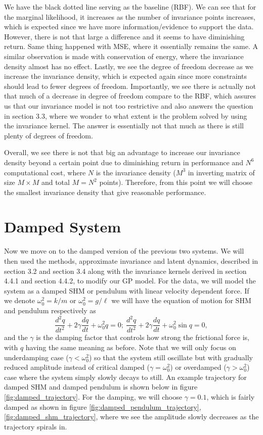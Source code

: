 \documentclass{statsmsc}
\begin{document}
We have the black dotted line serving as the baseline (RBF).
We can see that for the marginal likelihood, it increases as the number of invariance points increases, which is expected since we have more information/evidence to support the data.
However, there is not that large a difference and it seems to have diminishing return.
Same thing happened with MSE, where it essentially remains the same.
A similar observation is made with conservation of energy, where the invariance density almost has no effect. 
Lastly, we see the degree of freedom decrease as we increase the invariance density, which is expected again since more constraints should lead to fewer degrees of freedom.
Importantly, we see there is actually not that much of a decrease in degree of freedom compare to the RBF, which assures us that our invariance model is not too restrictive and also answers the question in section 3.3, where we wonder to what extent is the problem solved by using the invariance kernel.
The answer is essentially not that much as there is still plenty of degrees of freedom.

Overall, we see there is not that big an advantage to increase our invariance density beyond a certain point due to diminishing return in performance and $N^6$ computational cost, where $N$ is the invariance density ($M^3$ in inverting matrix of size $M\times M$ and total $M=N^2$ points).
Therefore, from this point we will choose the smallest invariance density that give reasonable performance.  


\section{Damped System}
Now we move on to the damped version of the previous two systems. 
We will then used the methods, approximate invariance and latent dynamics, described in section 3.2 and section 3.4 along with the invariance kernels derived in section 4.4.1 and section 4.4.2, to modify our GP model. 
For the data, we will model the system as a damped SHM or pendulum with linear velocity dependent force.
If we denote $\omega_0^2=k/m$ or $\omega_0^2=g/\ell$
we will have the equation of motion for SHM and pendulum respectively as
$$
\frac{d^2q}{dt^2}+2\gamma\frac{dq}{dt}+\omega_0^2q=0;\ \frac{d^2q}{dt^2}+2\gamma\frac{dq}{dt}+\omega_0^2\sin q=0 ,
$$
and the $\gamma$ is the damping factor that controls how strong the frictional force is, with $q$ having the same meaning as before. 
Note that we will only focus on underdamping case ($\gamma < \omega_0^2$) so that the system still oscillate but with gradually reduced amplitude instead of critical damped ($\gamma=\omega_0^2$) or overdamped ($\gamma>\omega_0^2$) case where the system simply slowly decays to still.
An example trajectory for damped SHM and damped pendulum is shown below in figure \ref{fig:damped_trajectory}.
For the damping, we will choose $\gamma= 0.1$, which is fairly damped as shown in figure \ref{fig:damped_pendulum_trajectory}, \ref{fig:damped_shm_trajectory}, where we see the amplitude slowly decreases as the trajectory spirals in. 
\end{document}
